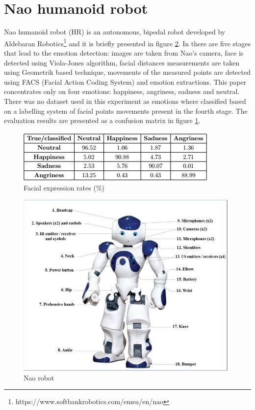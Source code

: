 \documentclass[runningheads,a4paper,12pt]{report}
\begin{document}
\section{Nao humanoid robot}
Nao humanoid robot (HR) is an autonomous, bipedal robot developed by Aldebaran Robotics\footnote{https://www.softbankrobotics.com/emea/en/nao} and it is briefly presented in figure \ref{fig:nao}. In \cite{nao-emotion} there are five stages that lead to the emotion detection: images are taken from Nao's camera, face is detected using Viola-Jones algorithm, facial distances measurements are taken using Geometrik based technique, movements of the measured points are detected using FACS (Facial Action Coding System) and emotion extractions. This paper concentrates only on four emotions: happiness, angriness, sadness and neutral. There was no dataset used in this experiment as emotions where classified based on a labelling system of facial points movements present in the fourth stage. The evaluation results are presented as a confusion matrix in figure \ref{table:nao}.

\begin{figure}[h]
	\centering
  	\includegraphics[width=0.7\linewidth]{./images/2_nao_table}
  	\caption{Facial expression rates (\%) \cite{nao-emotion}}
  	\label{table:nao}
\end{figure} 

\begin{figure}[h!]
	\centering
  	\includegraphics[width=0.6\linewidth]{./images/2_nao}
  	\caption{Nao robot \cite{nao}}
  	\label{fig:nao}
\end{figure} 
\end{document}
